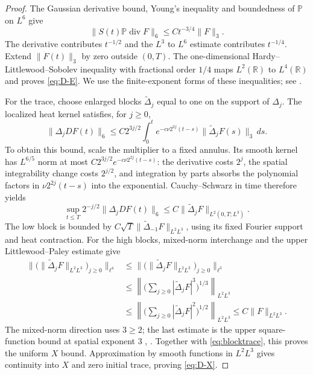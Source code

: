 \documentclass[11pt]{article}
\newcommand{\R}{\mathbb R}
\newcommand{\Pp}{\mathbb P}
\numberwithin{equation}{section}
\begin{document}
\begin{proof}
The Gaussian derivative bound, Young's inequality and boundedness of $\Pp$
on $L^6$ give
\begin{equation}\label{eq:heatkernel}
 \|S(t)\Pp\operatorname{div}F\|_6\leq Ct^{-3/4}\|F\|_3.
\end{equation}
The derivative contributes $t^{-1/2}$ and the $L^3$ to $L^6$ estimate
contributes $t^{-1/4}$. Extend $\|F(t)\|_3$ by zero outside $(0,T)$.
The one-dimensional Hardy--Littlewood--Sobolev inequality with fractional
order $1/4$ maps $L^2(\R)$ to $L^4(\R)$ and proves \eqref{eq:D-E}.
We use the finite-exponent forms of these inequalities; see
\cite[Corollary 6.3 and Theorem 6.4]{Tao2}.

For the trace, choose enlarged blocks $\widetilde\Delta_j$ equal to one on
the support of $\Delta_j$. The localized heat kernel satisfies, for $j\geq0$,
\[
 \|\Delta_jDF(t)\|_6\leq C2^{3j/2}
 \int_0^t e^{-c\nu2^{2j}(t-s)}
          \|\widetilde\Delta_jF(s)\|_3\,ds.
\]
To obtain this bound, scale the multiplier to a fixed annulus. Its smooth
kernel has $L^{6/5}$ norm at most
$C2^{3j/2}e^{-c\nu2^{2j}(t-s)}$: the derivative costs $2^j$, the spatial
integrability change costs $2^{j/2}$, and integration by parts absorbs the
polynomial factors in $\nu2^{2j}(t-s)$ into the exponential.
Cauchy--Schwarz in time therefore yields
\begin{equation}\label{eq:blocktrace}
 \sup_{t\leq T}2^{-j/2}\|\Delta_jDF(t)\|_6
 \leq C\|\widetilde\Delta_jF\|_{L^2(0,T;L^3)}.
\end{equation}
The low block is bounded by
$C\sqrt T\|\widetilde\Delta_{-1}F\|_{L^2L^3}$, using its fixed Fourier
support and heat contraction. For the high blocks, mixed-norm interchange
and the upper Littlewood--Paley estimate give
\begin{align*}
 \Big\|\big(\|\widetilde\Delta_jF\|_{L^2L^3}\big)_{j\geq0}\Big\|_{\ell^4}
 &\leq\Big\|\big(\|\widetilde\Delta_jF\|_{L^2L^3}\big)_{j\geq0}\Big\|_{\ell^3}\\
 &\leq\left\|\Big(\sum_{j\geq0}|\widetilde\Delta_jF|^3\Big)^{1/3}
        \right\|_{L^2L^3}\\
 &\leq\left\|\Big(\sum_{j\geq0}|\widetilde\Delta_jF|^2\Big)^{1/2}
        \right\|_{L^2L^3}
 \leq C\|F\|_{L^2L^3}.
\end{align*}
The mixed-norm direction uses $3\geq2$; the last estimate is the upper
square-function bound at spatial exponent $3$
\cite[Proposition 4.1]{Tao2}, \cite[Proposition 5.3]{Tao4}.
Together with \eqref{eq:blocktrace}, this proves the uniform $X$ bound.
Approximation by smooth functions in $L^2L^3$ gives continuity into $X$ and
zero initial trace, proving \eqref{eq:D-X}.


\end{proof}
\end{document}
